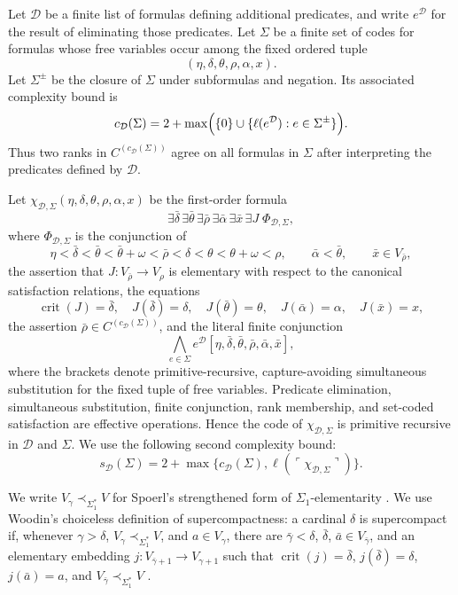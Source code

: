 \documentclass[11pt,a4paper]{amsart}
\newcommand{\crit}{\operatorname{crit}}
\theoremstyle{plain}
\theoremstyle{definition}
\theoremstyle{remark}
\begin{document}
Let $\mathcal D$ be a finite list of formulas defining additional predicates, and write $e^{\mathcal D}$ for the result of eliminating those predicates.  Let $\Sigma$ be a finite set of codes for formulas whose free variables occur among the fixed ordered tuple
\[
(\eta,\delta,\theta,\rho,\alpha,x).
\]
Let $\Sigma^{\pm}$ be the closure of $\Sigma$ under subformulas and negation.  Its associated complexity bound is
\[
c_{\mathcal D}(\Sigma)=2+\max\Bigl(\{0\}\cup
\{\ell(e^{\mathcal D}):e\in\Sigma^{\pm}\}\Bigr).
\]
Thus two ranks in $C^{(c_{\mathcal D}(\Sigma))}$ agree on all formulas in $\Sigma$ after interpreting the predicates defined by $\mathcal D$.

Let $\chi_{\mathcal D,\Sigma}(\eta,\delta,\theta,\rho,\alpha,x)$ be the first-order formula
\[
\exists\bar\delta\,\exists\bar\theta\,\exists\bar\rho\,
\exists\bar\alpha\,\exists\bar x\,\exists J\;\Phi_{\mathcal D,\Sigma},
\]
where $\Phi_{\mathcal D,\Sigma}$ is the conjunction of
\[
\eta<\bar\delta<\bar\theta<\bar\theta+\omega<\bar\rho<
\delta<\theta<\theta+\omega<\rho,\qquad
\bar\alpha<\bar\theta,\qquad \bar x\in V_{\bar\rho},
\]
the assertion that $J:V_{\bar\rho}\to V_\rho$ is elementary with respect to the canonical satisfaction relations, the equations
\[
\crit(J)=\bar\delta,\quad J(\bar\delta)=\delta,\quad
J(\bar\theta)=\theta,\quad J(\bar\alpha)=\alpha,\quad J(\bar x)=x,
\]
the assertion $\bar\rho\in C^{(c_{\mathcal D}(\Sigma))}$, and the literal finite conjunction
\[
\bigwedge_{e\in\Sigma}
e^{\mathcal D}
[\eta,\bar\delta,\bar\theta,\bar\rho,\bar\alpha,\bar x],
\]
where the brackets denote primitive-recursive, capture-avoiding simultaneous substitution for the fixed tuple of free variables.  Predicate elimination, simultaneous substitution, finite conjunction, rank membership, and set-coded satisfaction are effective operations.  Hence the code of $\chi_{\mathcal D,\Sigma}$ is primitive recursive in $\mathcal D$ and $\Sigma$.  We use the following second complexity bound:
\[
s_{\mathcal D}(\Sigma)=2+\max\bigl\{c_{\mathcal D}(\Sigma),
\ell(\ulcorner\chi_{\mathcal D,\Sigma}\urcorner)\bigr\}.
\]
\endgroup

We write $V_\gamma\prec_{\Sigma_1^*}V$ for Spoerl's strengthened form of $\Sigma_1$-elementarity \cite[Definition~20]{Spoerl}.  We use Woodin's choiceless definition of supercompactness: a cardinal $\delta$ is supercompact if, whenever $\gamma>\delta$, $V_\gamma\prec_{\Sigma_1^*}V$, and $a\in V_\gamma$, there are $\bar\gamma<\delta$, $\bar\delta$, $\bar a\in V_{\bar\gamma}$, and an elementary embedding $j:V_{\bar\gamma+1}\to V_{\gamma+1}$ such that $\crit(j)=\bar\delta$, $j(\bar\delta)=\delta$, $j(\bar a)=a$, and $V_{\bar\gamma}\prec_{\Sigma_1^*}V$ \cite[Definition~21]{Spoerl}.
\end{document}
